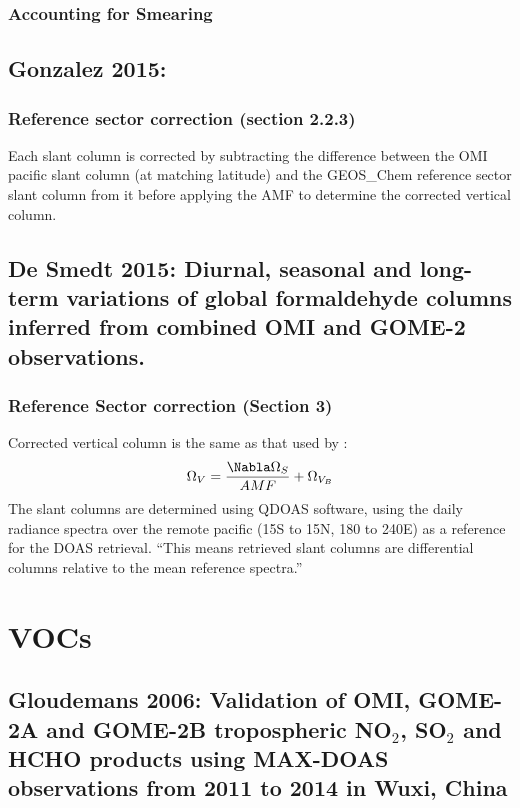 \documentclass[11pt]{article} %
\begin{document}
    \subsubsection{Accounting for Smearing}
      
  \subsection{Gonzalez 2015: }
    \citet{Gonzalez2015}
    \subsubsection{Reference sector correction (section 2.2.3)}
      Each slant column is corrected by subtracting the difference between the OMI pacific slant column (at matching latitude) and the GEOS_Chem reference sector slant column from it before applying the AMF to determine the corrected vertical column.
  
  \subsection{De Smedt 2015: Diurnal, seasonal and long-term variations of global formaldehyde columns inferred from combined OMI and GOME-2 observations.}
    \citet{DeSmedt2015}
    \subsubsection{Reference Sector correction (Section 3)}
      Corrected vertical column is the same as that used by \citet{Barkley2013}:
      \begin{equation*}
        \Omega_V = \frac{ \Nabla \Omega_{S} }{ AMF } + \Omega_{V_B}
      \end{equation*}
      The slant columns are determined using QDOAS software, using the daily radiance spectra over the remote pacific (15S to 15N, 180 to 240E) as a reference for the DOAS retrieval. 
      ``This means retrieved slant columns are differential columns relative to the mean reference spectra.''
      
      
\section{VOCs}
    
  \subsection{Gloudemans 2006: Validation of OMI, GOME-2A and GOME-2B tropospheric NO$_2$, SO$_2$ and HCHO products using MAX-DOAS observations from 2011 to 2014 in Wuxi, China}
    \citet{Gloudemans2006}
    
\end{document}
